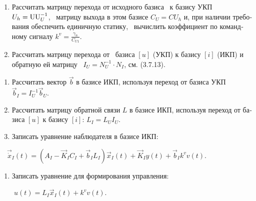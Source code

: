 \documentclass[a4paper]{article}
\newcommand\liststyleWWviiiNumxliii{%
\renewcommand\theenumi{\arabic{enumi}}
\renewcommand\theenumii{\arabic{enumii}}
\renewcommand\theenumiii{\arabic{enumiii}}
\renewcommand\theenumiv{\arabic{enumiv}}
\renewcommand\labelenumi{\theenumi.}
\renewcommand\labelenumii{\theenumii.}
\renewcommand\labelenumiii{\theenumiii.}
\renewcommand\labelenumiv{\theenumiv.}
}
\newcommand\liststyleWWviiiNumlix{%
\renewcommand\theenumi{\arabic{enumi}}
\renewcommand\theenumii{\arabic{enumii}}
\renewcommand\theenumiii{\arabic{enumiii}}
\renewcommand\theenumiv{\arabic{enumiv}}
\renewcommand\labelenumi{\theenumi.}
\renewcommand\labelenumii{\theenumii.}
\renewcommand\labelenumiii{\theenumiii.}
\renewcommand\labelenumiv{\theenumiv.}
}
\newcommand\liststyleWWviiiNumxxx{%
\renewcommand\theenumi{\arabic{enumi}}
\renewcommand\theenumii{\arabic{enumii}}
\renewcommand\theenumiii{\arabic{enumiii}}
\renewcommand\theenumiv{\arabic{enumiv}}
\renewcommand\labelenumi{\theenumi.}
\renewcommand\labelenumii{\theenumii.}
\renewcommand\labelenumiii{\theenumiii.}
\renewcommand\labelenumiv{\theenumiv.}
}
\newcommand\normalsubformula[1]{\text{\mathversion{normal}$#1$}}
\begin{document}
\liststyleWWviiiNumxliii
\begin{enumerate}
\item {\begin{russian}\sffamily
Рассчитать матрицу перехода от исходного базиса \ к базису УКП \  $U_h=\normalsubformula{\text{UU}}_U^{-1}$, \ матрицу
выхода в этом базисе  $C_U=CU_h$ и, при наличии требования обеспечить единичную статику, \ вычислить коэффициент по
командному сигналу  $k^v=\frac{γ_n}{C_{\mathit{U1}}}$.
\end{russian}}
\item {\begin{russian}\sffamily
Рассчитать матрицу перехода от \ базиса  $[u]$ (УКП) к базису  $[i]$ (ИКП) и обратную ей матрицу \  $I_U=N_U^{-1}\cdot
N_I$, см. (3.7.13).
\end{russian}}
\end{enumerate}
\liststyleWWviiiNumlix
\begin{enumerate}
\item {\begin{russian}\sffamily
Рассчитать вектор  $\vec b$ в базисе ИКП, используя переход от базиса УКП  $\vec b_I=I_U^{-1}\vec b_U$.
\end{russian}}
\item {\begin{russian}\sffamily
Рассчитать матрицу обратной связи  $L$ в базисе ИКП, используя переход от базиса  $[u]$ к базису  $[i]$:  $L_I=L_UI_U$.
\end{russian}}
\item {\begin{russian}\sffamily
Записать уравнение наблюдателя в базисе ИКП:
\end{russian}}
\end{enumerate}
{\begin{russian}\sffamily
\ \  $\vec{\dot x}_I(t)=\left(A_I-\vec K_IC_I+\vec b_IL_I\right)\vec x_I(t)+\vec K_Iy(t)+\vec b_Ik^vv(t)$.\ \ 
\end{russian}}

\liststyleWWviiiNumxxx
\begin{enumerate}
\item {\begin{russian}\sffamily
Записать уравнение для формирования управления:
\end{russian}}
\end{enumerate}
{\begin{russian}\sffamily
\ \ \ \  $u(t)=L_I\vec x_I(t)+k^vv(t)$.
\end{russian}}
\end{document}
